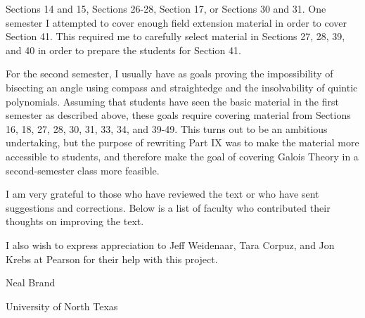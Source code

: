 \documentclass[11pt,oneside]{article}
\begin{document}
\BookNarrativetrue

\begin{BookBody}

\noindent Sections 14 and 15, Sections 26-28, Section 17, or Sections 30 and 31. One semester I attempted to cover enough field extension material in order to cover Section 41. This required me to carefully select material in Sections 27, 28, 39, and 40 in order to prepare the students for Section 41.

For the second semester, I usually have as goals proving the impossibility of bisecting an angle using compass and straightedge and the insolvability of quintic polynomials. Assuming that students have seen the basic material in the first semester as described above, these goals require covering material from Sections 16, 18, 27, 28, 30, 31, 33, 34, and 39-49. This turns out to be an ambitious undertaking, but the purpose of rewriting Part IX was to make the material more accessible to students, and therefore make the goal of covering Galois Theory in a second-semester class more feasible.


\noindent I am very grateful to those who have reviewed the text or who have sent suggestions and corrections. Below is a list of faculty who contributed their thoughts on improving the text.
















I also wish to express appreciation to Jeff Weidenaar, Tara Corpuz, and Jon Krebs at Pearson for their help with this project.

\noindent Neal Brand

\noindent University of North Texas

\end{BookBody}
\end{document}
